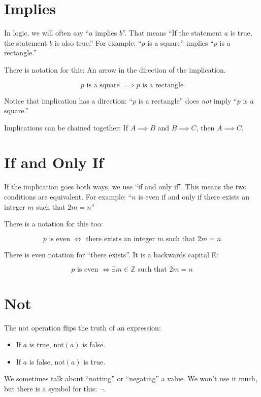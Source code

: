 \section{Implies}

In logic, we will often say ``$a$ implies $b$''.  That means ``If the
statement $a$ is true, the statement $b$ is also true.''  For example:
``$p$ is a square'' implies ``$p$ is a rectangle.''

There is notation for this: An arrow in the direction of the implication.

$$p \text{ is a square } \implies p \text{ is a rectangle}$$

Notice that implication has a direction: ``$p$ is a rectangle'' does \textit{not} imply 
``$p$ is a square.''

Implications can be chained together: If $A \implies B$ and $B \implies C$,  then $A \implies C$.

\section {If and Only If}

If the implication goes both ways, we use ``if and only if''.  This
means the two conditions are equivalent.  For example: ``$n$ is even
if and only if there exists an integer $m$ such that $2m = n$'' 

There is a notation for this too:

$$p \text{ is even } \iff \text{ there exists an integer } m \text{ such that } 2m = n$$

There is even notation for ``there exists''. It is a backwards capital E:

$$p \text{ is even } \iff \exists m \in \mathbb{Z}  \text{ such that } 2m = n$$

\section {Not}

The not operation flips the truth of an expression:
\begin{itemize}
\item If $a$ is true, $\text{not}(a)$ is false.

\item If $a$ is false, $\text{not}(a)$ is true.
\end{itemize}

We sometimes talk about ``notting'' or ``negating'' a value.  We won't
use it much, but there is a symbol for this: $\neg$.

